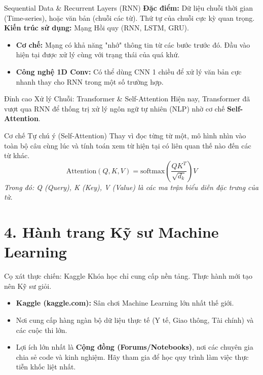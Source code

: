 \documentclass[aspectratio=169]{beamer}
\begin{document}
\begin{frame}{Sequential Data \& Recurrent Layers (RNN)}
    \textbf{Đặc điểm:} Dữ liệu chuỗi thời gian (Time-series), hoặc văn bản (chuỗi các từ). Thứ tự của chuỗi cực kỳ quan trọng. \\
    
    \vspace{0.5cm}
    \textbf{Kiến trúc sử dụng:} Mạng Hồi quy (RNN, LSTM, GRU). \\
    
    \begin{itemize}
        \item \textbf{Cơ chế:} Mạng có khả năng "nhớ" thông tin từ các bước trước đó. Đầu vào hiện tại được xử lý cùng với trạng thái của quá khứ.
        \item \textbf{Công nghệ 1D Conv:} Có thể dùng CNN 1 chiều để xử lý văn bản cực nhanh thay cho RNN trong một số trường hợp.
    \end{itemize}
\end{frame}

\begin{frame}{Đỉnh cao Xử lý Chuỗi: Transformer \& Self-Attention}
    Hiện nay, Transformer đã vượt qua RNN để thống trị xử lý ngôn ngữ tự nhiên (NLP) nhờ cơ chế \textbf{Self-Attention}.
    
    \begin{block}{Cơ chế Tự chú ý (Self-Attention)}
        Thay vì đọc từng từ một, mô hình nhìn vào toàn bộ câu cùng lúc và tính toán xem từ hiện tại có liên quan thế nào đến các từ khác.
        \begin{equation*}
            \text{Attention}(Q, K, V) = \text{softmax}\left(\frac{QK^T}{\sqrt{d_k}}\right)V
        \end{equation*}
        \textit{Trong đó: Q (Query), K (Key), V (Value) là các ma trận biểu diễn đặc trưng của từ.}
    \end{block}
\end{frame}

\section{4. Hành trang Kỹ sư Machine Learning}

\begin{frame}{Cọ xát thực chiến: Kaggle}
    Khóa học chỉ cung cấp nền tảng. Thực hành mới tạo nên Kỹ sư giỏi.
    \begin{itemize}
        \item \textbf{Kaggle (kaggle.com):} Sân chơi Machine Learning lớn nhất thế giới. 
        \item Nơi cung cấp hàng ngàn bộ dữ liệu thực tế (Y tế, Giao thông, Tài chính) và các cuộc thi lớn.
        \item Lợi ích lớn nhất là \textbf{Cộng đồng (Forums/Notebooks)}, nơi các chuyên gia chia sẻ code và kinh nghiệm. Hãy tham gia để học quy trình làm việc thực tiễn khốc liệt nhất.
    \end{itemize}
\end{frame}
\end{document}
